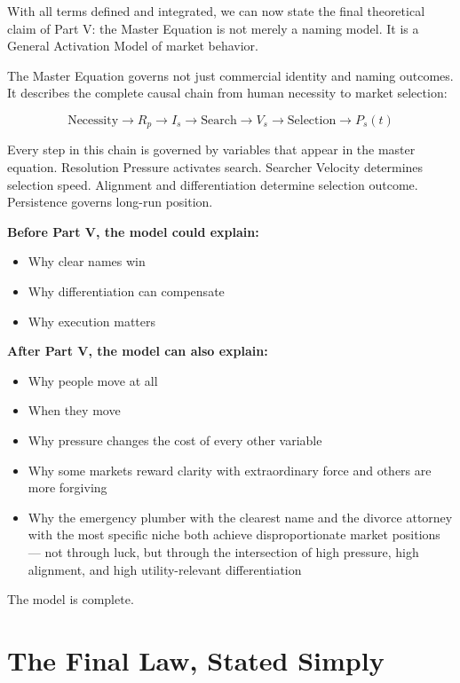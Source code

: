 \documentclass[12pt, openany]{book}
\theoremstyle{thmstyle}
\theoremstyle{defstyle}
\begin{document}
With all terms defined and integrated, we can now state the final theoretical claim of Part V: the Master Equation is not merely a naming model. It is a General Activation Model of market behavior.

\begin{keybox}
The Master Equation governs not just commercial identity and naming outcomes. It describes the complete causal chain from human necessity to market selection:

\[
\text{Necessity} \rightarrow R_p \rightarrow I_s \rightarrow \text{Search} \rightarrow V_s \rightarrow \text{Selection} \rightarrow P_s(t)
\]

Every step in this chain is governed by variables that appear in the master equation. Resolution Pressure activates search. Searcher Velocity determines selection speed. Alignment and differentiation determine selection outcome. Persistence governs long-run position.

\textbf{Before Part V, the model could explain:}
\begin{itemize}[leftmargin=1.5em]
  \item Why clear names win
  \item Why differentiation can compensate
  \item Why execution matters
\end{itemize}

\textbf{After Part V, the model can also explain:}
\begin{itemize}[leftmargin=1.5em]
  \item Why people move at all
  \item When they move
  \item Why pressure changes the cost of every other variable
  \item Why some markets reward clarity with extraordinary force and others are more forgiving
  \item Why the emergency plumber with the clearest name and the divorce attorney with the most specific niche both achieve disproportionate market positions --- not through luck, but through the intersection of high pressure, high alignment, and high utility-relevant differentiation
\end{itemize}

The model is complete.
\end{keybox}

\section{The Final Law, Stated Simply}
\end{document}
